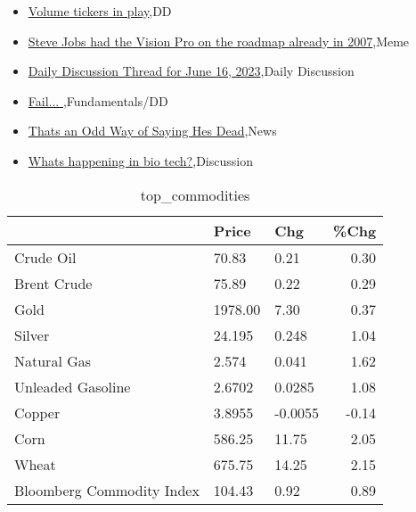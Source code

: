 \documentclass{article}%
\begin{document}
%
\begin{itemize}%
\item%
\href{https://reddit.com/r/wallstreetbets/comments/14avd2a/volume\_tickers\_in\_play/}{Volume tickers in play},DD%
\item%
\href{https://reddit.com/r/wallstreetbets/comments/14aujg7/steve\_jobs\_had\_the\_vision\_pro\_on\_the\_roadmap/}{Steve Jobs had the Vision Pro on the roadmap already in 2007},Meme%
\item%
\href{https://reddit.com/r/wallstreetbets/comments/14asrve/daily\_discussion\_thread\_for\_june\_16\_2023/}{Daily Discussion Thread for June 16, 2023},Daily Discussion%
\item%
\href{https://reddit.com/r/StockMarket/comments/14aw03x/fail/}{Fail... },Fundamentals/DD%
\item%
\href{https://reddit.com/r/StockMarket/comments/14amw7i/thats\_an\_odd\_way\_of\_saying\_hes\_dead/}{Thats an Odd Way of Saying Hes Dead},News%
\item%
\href{https://reddit.com/r/StockMarket/comments/14agorw/whats\_happening\_in\_bio\_tech/}{Whats happening in bio tech?},Discussion%
\end{itemize}%


\begin{table}[htbp]%
\caption{top\_commodities}%
\centering%
\begin{adjustbox}{width=1\textwidth}%
\begin{tabular}{lllr}
\toprule
                          &   Price &     Chg &  \%Chg \\
\midrule
               Crude Oil  &   70.83 &    0.21 &  0.30 \\
             Brent Crude  &   75.89 &    0.22 &  0.29 \\
                    Gold  & 1978.00 &    7.30 &  0.37 \\
                  Silver  &  24.195 &   0.248 &  1.04 \\
             Natural Gas  &   2.574 &   0.041 &  1.62 \\
       Unleaded Gasoline  &  2.6702 &  0.0285 &  1.08 \\
                  Copper  &  3.8955 & -0.0055 & -0.14 \\
                    Corn  &  586.25 &   11.75 &  2.05 \\
                   Wheat  &  675.75 &   14.25 &  2.15 \\
Bloomberg Commodity Index &  104.43 &    0.92 &  0.89 \\
\bottomrule
\end{tabular}
%
\end{adjustbox}%
\end{table}
\end{document}
